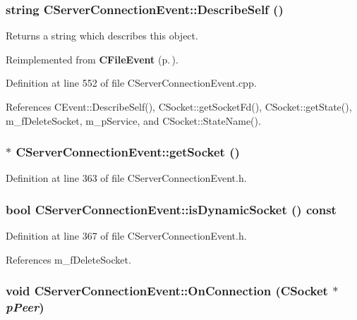\subsubsection{\setlength{\rightskip}{0pt plus 5cm}string CServer\-Connection\-Event::Describe\-Self ()\hspace{0.3cm}{\tt  [virtual]}}\label{classCServerConnectionEvent_a14}


Returns a string which describes this object. 

Reimplemented from {\bf CFile\-Event} {\rm (p.\,\pageref{classCFileEvent_a19})}.

Definition at line 552 of file CServer\-Connection\-Event.cpp.

References CEvent::Describe\-Self(), CSocket::get\-Socket\-Fd(), CSocket::get\-State(), m\_\-f\-Delete\-Socket, m\_\-p\-Service, and CSocket::State\-Name().
\subsubsection{$\ast$ CServer\-Connection\-Event::get\-Socket ()\hspace{0.3cm}{\tt  [inline]}}\label{classCServerConnectionEvent_a10}




Definition at line 363 of file CServer\-Connection\-Event.h.
\subsubsection{\setlength{\rightskip}{0pt plus 5cm}bool CServer\-Connection\-Event::is\-Dynamic\-Socket () const\hspace{0.3cm}{\tt  [inline]}}\label{classCServerConnectionEvent_a11}




Definition at line 367 of file CServer\-Connection\-Event.h.

References m\_\-f\-Delete\-Socket.
\subsubsection{\setlength{\rightskip}{0pt plus 5cm}void CServer\-Connection\-Event::On\-Connection ({\bf CSocket} $\ast$ {\em p\-Peer})\hspace{0.3cm}{\tt  [virtual]}}\label{classCServerConnectionEvent_a12}


